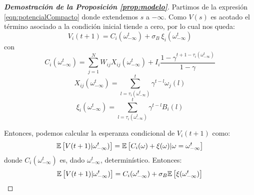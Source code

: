 \begin{proof}[\bf{Demostración de la Proposición \ref{prop:modelo}}]
Partimos de la expresión \eqref{eqn:potencialCompacto} donde extendemos $s$ a $-\infty$. Como $V(s)$ es acotado el término asociado a la condición inicial tiende a cero, por lo cual nos queda:
\begin{equation}
  V_i(t+1) = C_i(\omega_{-\infty}^t) + \sigma_B \  \xi_i(\omega_{-\infty}^t)
  \label{eqn:potencial}
\end{equation}
con
\begin{equation}
     C_i(\omega_{-\infty}^t) = \sum_{j=1}^N W_{ij} X_{ij}(\omega_{-\infty}^t) + I_i \frac{1-\gamma^{t+1-\tau_i(\omega_{-\infty}^t) }}{1-\gamma}
     \label{eqn:Ci}
\end{equation}
\begin{equation}
    X_{ij}(\omega_{-\infty}^t) = \sum_{l=\tau_i(\omega_{-\infty}^t)}^t \gamma^{t-l} \omega_j(l)
    \label{eqn:Xij}
\end{equation}
\begin{equation}
    \xi_i(\omega_{-\infty}^t) = \sum_{l=\tau_i(\omega_{-\infty}^t)}^t \gamma^{t-l} B_i(l)
    \label{eqn:xi}
\end{equation}

Entonces, podemos calcular la esperanza condicional de $V_i(t+1)$ como:
\begin{equation*}
    \mathbb{E} \left[V(t+1) | \omega_{-\infty}^t)\right] = \mathbb{E} \left[C_i(\omega) + \xi(\omega) | \omega=\omega_{-\infty}^t \right]
\end{equation*}
donde $C_i(\omega_{-\infty}^t)$ es, dado $\omega_{-\infty}^t$, determinístico. Entonces:
\begin{equation}
    \mathbb{E} \left[V(t+1) | \omega_{-\infty}^t)\right] = C_i(\omega_{-\infty}^t) + \sigma_B \mathbb{E} \left[\xi(\omega_{-\infty}^t)\right]
    \label{eqn:esperanza1}
\end{equation}


\end{proof}
